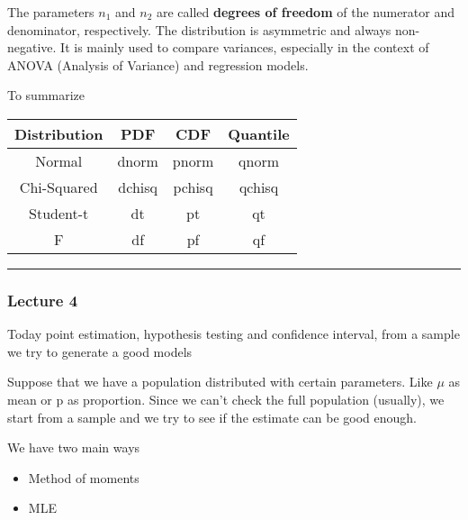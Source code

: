 The parameters $n_1$ and $n_2$ are called \textbf{degrees of freedom} of the numerator and denominator, respectively.  
The distribution is asymmetric and always non-negative.  
It is mainly used to compare variances, especially in the context of ANOVA (Analysis of Variance) and regression models.


\vspace{10pt}

To summarize

\begin{table}[h]
    \centering
    \begin{tabular}{|c|c|c|c|} %
        \hline %
        \textbf{Distribution} & \textbf{PDF}  & \textbf{CDF}  & \textbf{Quantile} \\
        \hline %
        Normal & dnorm & pnorm & qnorm \\
        \hline
        Chi-Squared & dchisq & pchisq & qchisq \\
        \hline
        Student-t & dt & pt & qt \\
        \hline
        F & df & pf & qf \\
        \hline %
    \end{tabular}
    \label{tab:distributions}
\end{table}

\vspace{10pt}

\hrule

\vspace{10pt}




\subsubsection{Lecture 4}

Today point estimation, hypothesis testing and confidence interval, from a sample we try to generate a good models

\vspace{10pt}

Suppose that we have a population distributed with certain parameters. Like $\mu$ as mean or p as proportion.
Since we can't check the full population (usually), we start from a sample and we try to see if the estimate can be good enough.

\vspace{10pt}

We have two main ways
\begin{itemize}
    \item Method of moments
    \item MLE
\end{itemize}


